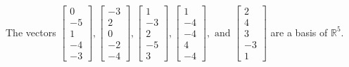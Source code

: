 \begin{exercise}
\begin{exerciseStatement}
  \end{exerciseStatement}
  \begin{exerciseAnswer}
   The vectors \(\left[\begin{array}{r}
0 \\
-5 \\
1 \\
-4 \\
-3
\end{array}\right] , \left[\begin{array}{r}
-3 \\
2 \\
0 \\
-2 \\
-4
\end{array}\right] , \left[\begin{array}{r}
1 \\
-3 \\
2 \\
-5 \\
3
\end{array}\right] , \left[\begin{array}{r}
1 \\
-4 \\
-4 \\
4 \\
-4
\end{array}\right] , \text{ and } \left[\begin{array}{r}
2 \\
4 \\
3 \\
-3 \\
1
\end{array}\right]\) 
  	 are  a basis of \(\mathbb{R}^5\).
  


  \end{exerciseAnswer}
\end{exercise}